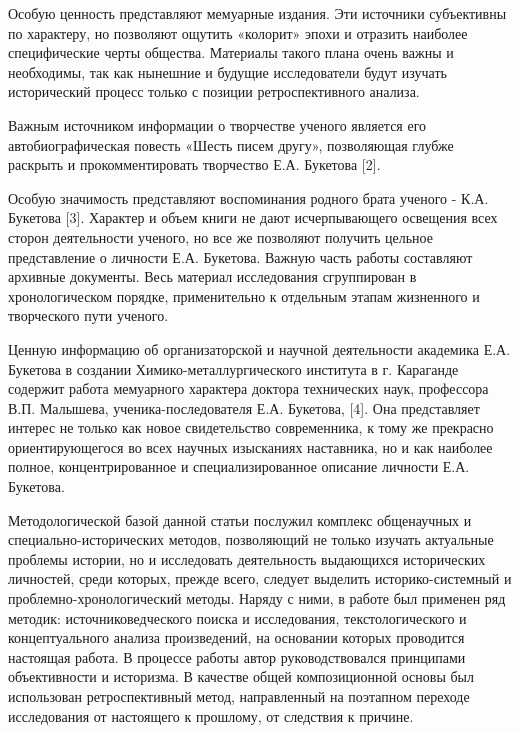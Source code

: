 \begin{multicols}{2}
Особую ценность представляют мемуарные издания. Эти источники
субъективны по характеру, но позволяют ощутить «колорит» эпохи и
отразить наиболее специфические черты общества. Материалы такого плана
очень важны и необходимы, так как нынешние и будущие исследователи будут
изучать исторический процесс только с позиции ретроспективного анализа.

Важным источником информации о творчестве ученого является его
автобиографическая повесть «Шесть писем другу», позволяющая глубже
раскрыть и прокомментировать творчество Е.А. Букетова {[}2{]}.

Особую значимость представляют воспоминания родного брата ученого - К.А.
Букетова {[}3{]}. Характер и объем книги не дают исчерпывающего
освещения всех сторон деятельности ученого, но все же позволяют получить
цельное представление о личности Е.А. Букетова. Важную часть работы
составляют архивные документы. Весь материал исследования сгруппирован в
хронологическом порядке, применительно к отдельным этапам жизненного и
творческого пути ученого.

Ценную информацию об организаторской и научной деятельности академика
Е.А. Букетова в создании Химико-металлургического института в г.
Караганде содержит работа мемуарного характера доктора технических наук,
профессора В.П. Малышева, ученика-последователя Е.А. Букетова, {[}4{]}.
Она представляет интерес не только как новое свидетельство современника,
к тому же прекрасно ориентирующегося во всех научных изысканиях
наставника, но и как наиболее полное, концентрированное и
специализированное описание личности Е.А. Букетова.

Методологической базой данной статьи послужил комплекс общенаучных и
специально-исторических методов, позволяющий не только изучать
актуальные проблемы истории, но и исследовать деятельность выдающихся
исторических личностей, среди которых, прежде всего, следует выделить
историко-системный и проблемно-хронологический методы. Наряду с ними, в
работе был применен ряд методик: источниковедческого поиска и
исследования, текстологического и концептуального анализа произведений,
на основании которых проводится настоящая работа. В процессе работы
автор руководствовался принципами объективности и историзма. В качестве
общей композиционной основы был использован ретроспективный метод,
направленный на поэтапном переходе исследования от настоящего к
прошлому, от следствия к причине.


\end{multicols}
